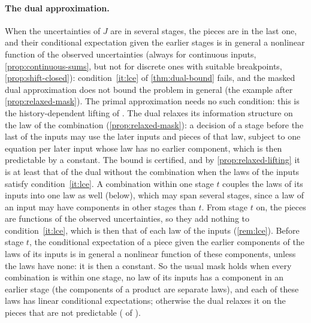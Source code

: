 \paragraph{The dual approximation.}
When the uncertainties of $J$ are in several stages, the pieces are in the last one,
and their conditional expectation given the earlier stages is in general a nonlinear function of the observed uncertainties
(always for continuous inputs, \cref{prop:continuous-sums}, but not for discrete ones with suitable breakpoints, \cref{prop:shift-closed}):
condition~\ref{it:lce} of \cref{thm:dual-bound} fails, and the masked dual approximation does not bound the problem in general (the example after \cref{prop:relaxed-mask}).
The primal approximation needs no such condition: this is the history-dependent lifting of \citet[Remark~6.5]{GWK2015}.
The dual relaxes its information structure on the law of the combination (\cref{prop:relaxed-mask}):
a decision of a stage before the last of the inputs may use the later inputs and pieces of that law,
subject to one equation per later input whose law has no earlier component, which is then predictable by a constant.
The bound is certified, and by \cref{prop:relaxed-lifting} it is at least that of the dual without the combination when the laws of the inputs satisfy condition~\ref{it:lce}.
A combination within one stage $t$ couples the laws of its inputs into one law as well (below), which may span several stages, since a law of an input may have components in other stages than $t$.
From stage $t$ on, the pieces are functions of the observed uncertainties, so they add nothing to condition~\ref{it:lce}, which is then that of each law of the inputs (\cref{rem:lce}).
Before stage $t$, the conditional expectation of a piece given the earlier components of the laws of its inputs is in general a nonlinear function of these components, unless the laws have none: it is then a constant.
So the usual mask holds when every combination is within one stage, no law of its inputs has a component in an earlier stage (the components of a product are separate laws), and each of these laws has linear conditional expectations;
otherwise the dual relaxes it on the pieces that are not predictable
( of ).

